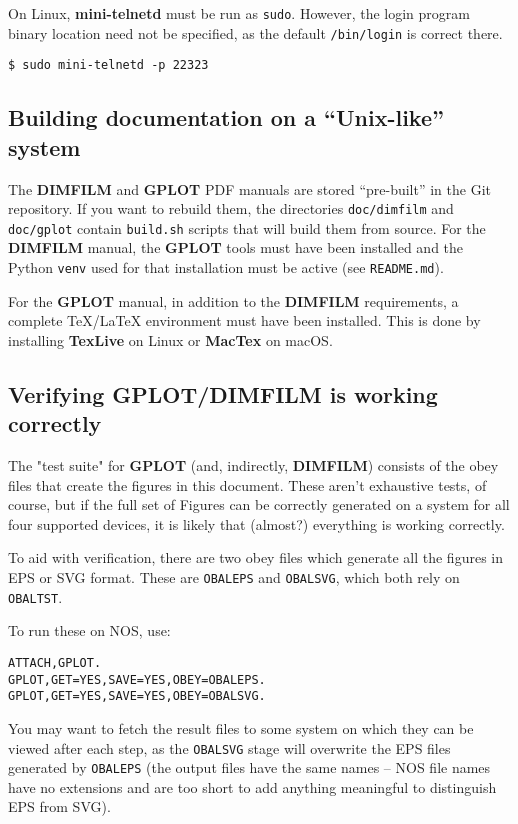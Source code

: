 \documentclass[a4paper,twoside,11pt]{article}
\newcommand{\newpara}{\par\vspace{4mm}\noindent}
\begin{document}
\newpara
On Linux, \textbf{mini-telnetd} must be run as \texttt{sudo}. However, the login program binary location need not be specified,
as the default \texttt{/bin/login} is correct there.
\begin{lstlisting}
$ sudo mini-telnetd -p 22323 
\end{lstlisting}

\subsection{Building documentation on a ``Unix-like'' system}
\newpara
The \textbf{DIMFILM} and \textbf{GPLOT} PDF manuals are stored ``pre-built'' in the Git repository. If you want to rebuild them,
the directories \texttt{doc/dimfilm} and \texttt{doc/gplot} contain \texttt{build.sh} scripts that will build them from source. For
the \textbf{DIMFILM} manual, the \textbf{GPLOT} tools must have been installed and
the Python \texttt{venv} used for that installation must be active
(see \texttt{README.md}).

\newpara
For the \textbf{GPLOT} manual, in addition to the \textbf{DIMFILM} requirements, a complete TeX/LaTeX environment
must have been installed. This is done by installing \textbf{TexLive} on Linux or \textbf{MacTex} on macOS.

\subsection{Verifying GPLOT/DIMFILM is working correctly}

The "test suite" for \textbf{GPLOT} (and, indirectly, \textbf{DIMFILM}) consists of the obey files that
create the figures in this document. These aren't exhaustive tests, of course, but
if the full set of Figures can be correctly generated on a system for all four
supported devices, it is likely that (almost?) everything is working correctly.

\newpara
To aid with verification, there are two obey files which generate all the figures
in EPS or SVG format. These are \texttt{OBALEPS} and \texttt{OBALSVG},
which both rely on \texttt{OBALTST}.

\newpara
To run these on NOS, use:
\begin{lstlisting}
ATTACH,GPLOT.
GPLOT,GET=YES,SAVE=YES,OBEY=OBALEPS.
GPLOT,GET=YES,SAVE=YES,OBEY=OBALSVG.
\end{lstlisting}

\newpara
You may want to fetch the result files to some system on which they can be
viewed after each step, as the \texttt{OBALSVG} stage will overwrite the EPS files
generated by \texttt{OBALEPS} (the output files have the same names -- NOS file names
have no extensions and are too short to add anything meaningful to distinguish 
EPS from SVG).
\end{document}
